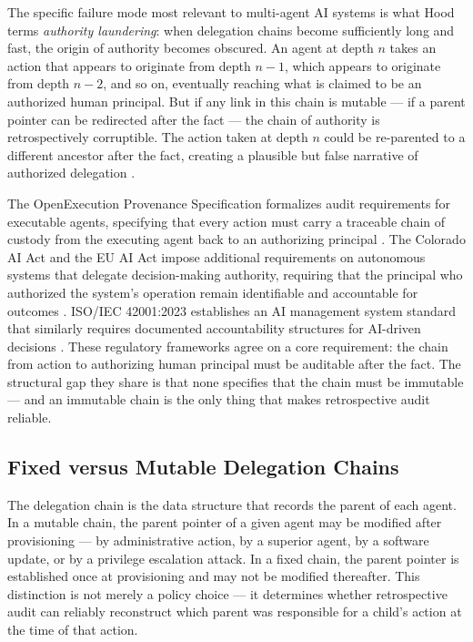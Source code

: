 The specific failure mode most relevant to multi-agent AI systems is what Hood terms \emph{authority laundering}: when delegation chains become sufficiently long and fast, the origin of authority becomes obscured. An agent at depth $n$ takes an action that appears to originate from depth $n-1$, which appears to originate from depth $n-2$, and so on, eventually reaching what is claimed to be an authorized human principal. But if any link in this chain is mutable — if a parent pointer can be redirected after the fact — the chain of authority is retrospectively corruptible. The action taken at depth $n$ could be re-parented to a different ancestor after the fact, creating a plausible but false narrative of authorized delegation \cite{zylos2026,auditableagents2026}.

The OpenExecution Provenance Specification formalizes audit requirements for executable agents, specifying that every action must carry a traceable chain of custody from the executing agent back to an authorizing principal \cite{openexecution2026}. The Colorado AI Act and the EU AI Act impose additional requirements on autonomous systems that delegate decision-making authority, requiring that the principal who authorized the system's operation remain identifiable and accountable for outcomes \cite{coloradosb24205,euai2024}. ISO/IEC 42001:2023 establishes an AI management system standard that similarly requires documented accountability structures for AI-driven decisions \cite{iso42001}. These regulatory frameworks agree on a core requirement: the chain from action to authorizing human principal must be auditable after the fact. The structural gap they share is that none specifies that the chain must be immutable — and an immutable chain is the only thing that makes retrospective audit reliable.

\subsection{Fixed versus Mutable Delegation Chains}
\label{sec:fixed-vs-mutable}

The delegation chain is the data structure that records the parent of each agent. In a mutable chain, the parent pointer of a given agent may be modified after provisioning — by administrative action, by a superior agent, by a software update, or by a privilege escalation attack. In a fixed chain, the parent pointer is established once at provisioning and may not be modified thereafter. This distinction is not merely a policy choice — it determines whether retrospective audit can reliably reconstruct which parent was responsible for a child's action at the time of that action.


